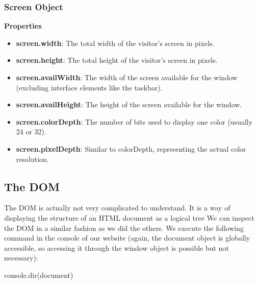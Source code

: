 \documentclass{report}
\begin{document}
    \subsubsection{Screen Object}
    \textbf{Properties}
    \begin{itemize}
        \item \textbf{screen.width}: The total width of the visitor’s screen in pixels.
        \item \textbf{screen.height}: The total height of the visitor’s screen in pixels.
        \item \textbf{screen.availWidth}: The width of the screen available for the window (excluding interface elements like the taskbar).
        \item \textbf{screen.availHeight}: The height of the screen available for the window.
        \item \textbf{screen.colorDepth}: The number of bits used to display one color (usually 24 or 32).
        \item \textbf{screen.pixelDepth}: Similar to colorDepth, representing the actual color resolution.
    \end{itemize}

    \bigbreak \noindent 
    \subsection{The DOM}
    \bigbreak \noindent 
    The DOM is actually not very complicated to understand. It is a way of displaying the structure of an HTML document as a logical tree
    \bigbreak \noindent 
    We can inspect the DOM in a similar fashion as we did the others. We execute
    the following command in the console of our website (again, the document object
    is globally accessible, so accessing it through the window object is possible but not
    necessary):
    \bigbreak \noindent 
    \begin{jscode}
        console.dir(document)
    \end{jscode}

    \bigbreak \noindent 
\end{document}
